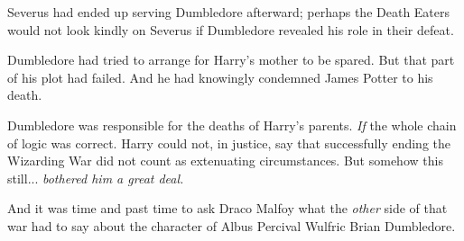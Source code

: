 Severus had ended up serving Dumbledore afterward; perhaps the Death
Eaters would not look kindly on Severus if Dumbledore revealed his role
in their defeat.

Dumbledore had tried to arrange for Harry's mother to be spared. But
that part of his plot had failed. And he had knowingly condemned James
Potter to his death.

Dumbledore was responsible for the deaths of Harry's parents. \emph{If}
the whole chain of logic was correct. Harry could not, in justice, say
that successfully ending the Wizarding War did not count as extenuating
circumstances. But somehow this still... \emph{bothered him a great
deal.}

And it was time and past time to ask Draco Malfoy what the \emph{other}
side of that war had to say about the character of Albus Percival
Wulfric Brian Dumbledore.
